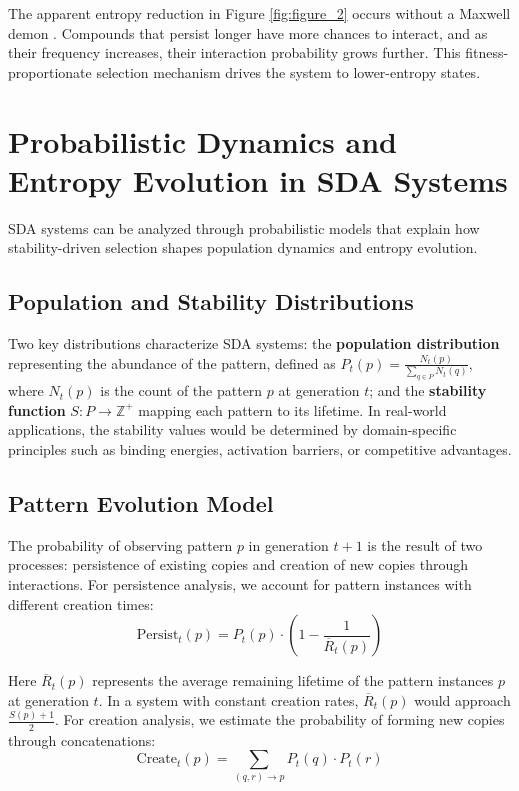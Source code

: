 \documentclass[preprint,12pt]{elsarticle}
\begin{document}
The apparent entropy reduction in Figure \ref{fig:figure_2} occurs without a Maxwell demon \cite{leff2002maxwell}. Compounds that persist longer have more chances to interact, and as their frequency increases, their interaction probability grows further. This fitness-proportionate selection mechanism \cite{back1996evolutionary, goldberg1989genetic, holland1975adaptation} drives the system to lower-entropy states.

\section{Probabilistic Dynamics and Entropy Evolution in SDA Systems}

SDA systems can be analyzed through probabilistic models that explain how stability-driven selection shapes population dynamics and entropy evolution.

\subsection{Population and Stability Distributions}

Two key distributions characterize SDA systems: the \textbf{population distribution} representing the abundance of the pattern, defined as \( P_t(p) = \frac{N_t(p)}{\sum_{q \in P} N_t(q)} \), where \( N_t(p) \) is the count of the pattern \( p \) at generation \( t \); and the \textbf{stability function} \( S: P \rightarrow \mathbb{Z}^{+} \) mapping each pattern to its lifetime. In real-world applications, the stability values would be determined by domain-specific principles such as binding energies, activation barriers, or competitive advantages.

\subsection{Pattern Evolution Model}

The probability of observing pattern \(p\) in generation \(t+1\) is the result of two processes: persistence of existing copies and creation of new copies through interactions. For persistence analysis, we account for pattern instances with different creation times:
\begin{equation}
\label{eq:persist-term}
\mathrm{Persist}_t(p) = P_t(p) \cdot \left(1 - \frac{1}{\overline{R}_t(p)}\right)
\end{equation}

Here \(\overline{R}_t(p)\) represents the average remaining lifetime of the pattern instances \(p\) at generation \(t\). In a system with constant creation rates, \(\overline{R}_t(p)\) would approach \(\frac{S(p)+1}{2}\). For creation analysis, we estimate the probability of forming new copies through concatenations:
\begin{equation}
\label{eq:create-term}
\mathrm{Create}_t(p) = \sum_{(q,r) \to p} P_t(q) \cdot P_t(r)
\end{equation}
\end{document}

